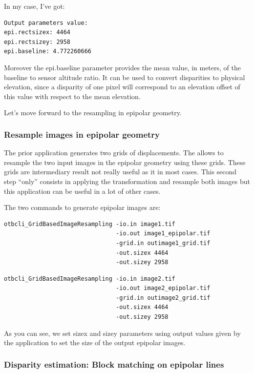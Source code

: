 In my case, I've got:

\begin{verbatim}
Output parameters value:
epi.rectsizex: 4464
epi.rectsizey: 2958
epi.baseline: 4.772260666
\end{verbatim}

Moreover the epi.baseline parameter provides the mean value, in meters, of the
baseline to sensor altitude ratio. It can be used to convert disparities to
physical elevation, since a disparity of one pixel will correspond to an
elevation offset of this value with respect to the mean elevation.

Let's move forward to the resampling in epipolar geometry.

\subsubsection{Resample images in epipolar geometry}

The prior application generates two grids of displacements. The
 allows to resample the two input images
in the epipolar geometry using these grids.  These grids are intermediary result
not really useful as it in most cases. This second step ``only'' consists in
applying the transformation and resample both images but this application can be
useful in a lot of other cases.

The two commands to generate epipolar images are:
\begin{verbatim}
otbcli_GridBasedImageResampling -io.in image1.tif
                                -io.out image1_epipolar.tif
                                -grid.in outimage1_grid.tif
                                -out.sizex 4464
                                -out.sizey 2958
\end{verbatim}

\begin{verbatim}
otbcli_GridBasedImageResampling -io.in image2.tif
                                -io.out image2_epipolar.tif
                                -grid.in outimage2_grid.tif
                                -out.sizex 4464
                                -out.sizey 2958
\end{verbatim}

As you can see, we set sizex and sizey parameters using output values given by
the  application to set the size
of the output epipolar images.

\subsubsection{Disparity estimation: Block matching on epipolar lines}

